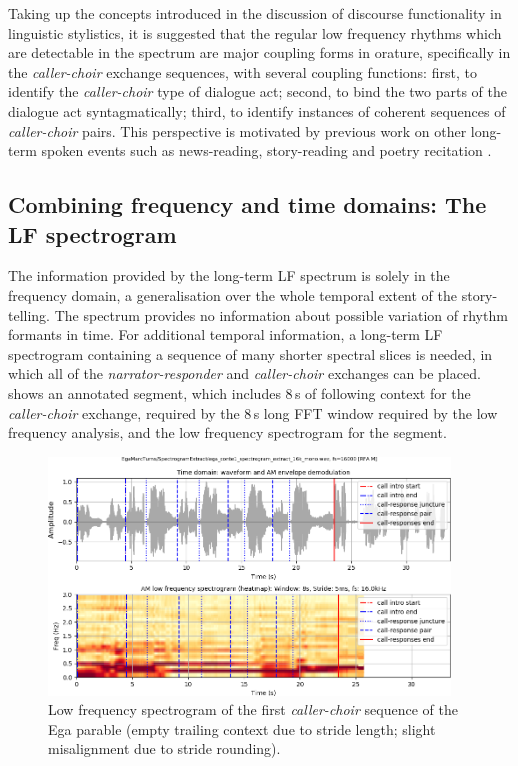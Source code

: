 \documentclass[output=paper,colorlinks,citecolor=brown]{langscibook}
\begin{document}
Taking up the concepts introduced in the discussion of discourse functionality in linguistic stylistics, it is suggested that the regular low frequency rhythms which are detectable in the spectrum are major coupling forms in orature, specifically in the \textit{caller-choir} exchange sequences, with several coupling functions: first, to identify the \textit{caller-choir} type of dialogue act; second, to bind the two parts of the dialogue act syntagmatically; third, to identify instances of coherent sequences of \textit{caller-choir} pairs. This perspective is motivated by previous work on other long-term spoken events such as news-reading, story-reading and poetry recitation \citep{gibbonjipa2021, gibbon4urua2022, gibbonsp2022}.

\subsection{Combining frequency and time domains: The LF spectrogram}

The information provided by the long-term LF spectrum is solely in the frequency domain, a generalisation over the whole temporal extent of the story-telling. The spectrum provides no information about possible variation of rhythm formants in time. For additional temporal information, a long-term LF spectrogram containing a sequence of many shorter spectral slices is needed, in which all of the \textit{narrator-responder} and \textit{caller-choir} exchanges can be placed.  shows an annotated segment, which includes 8\,s of following context for the \textit{caller-choir} exchange, required by the 8\,s long FFT window required by the low frequency analysis, and the low frequency spectrogram for the segment.

\begin{figure}
\includegraphics[trim={1.5cm 1cm 0 0}, clip, width=0.95\textwidth]{gibbon_figure07.png}
\caption{\label{fig:fig07}Low frequency spectrogram of the first \textit{caller-choir} sequence of the Ega parable (empty trailing context due to stride length; slight misalignment due to stride rounding).}
\end{figure}
\end{document}
